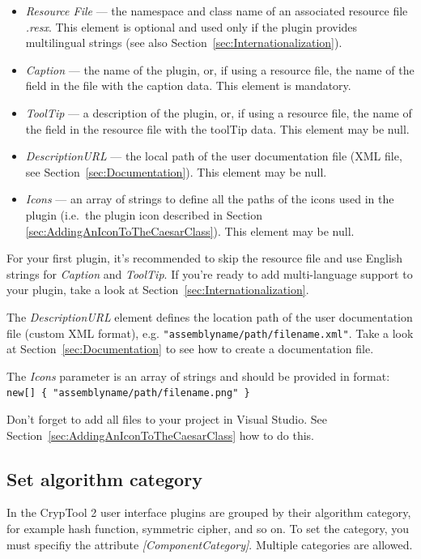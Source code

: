 \begin{itemize}
	\item \textit{Resource File} --- the namespace and class name of an associated resource file \textit{.resx}. This element is optional and used only if the plugin provides multilingual strings (see also Section~\ref{sec:Internationalization}).
	\item \textit{Caption} --- the name of the plugin, or, if using a resource file, the name of the field in the file with the caption data. This element is mandatory.
	\item \textit{ToolTip} --- a description of the plugin, or, if using a resource file, the name of the field in the resource file with the toolTip data. This element may be null.
	\item \textit{DescriptionURL} --- the local path of the user documentation file (XML file, see Section~\ref{sec:Documentation}). This element may be null.
	\item \textit{Icons} --- an array of strings to define all the paths of the icons used in the plugin (i.e.\ the plugin icon described in Section \ref{sec:AddingAnIconToTheCaesarClass}). This element may be null.
\end{itemize}

For your first plugin, it's recommended to skip the resource file and use English strings for \textit{Caption} and \textit{ToolTip}. If you're ready to add multi-language support to your plugin, take a look at Section~\ref{sec:Internationalization}.

The \textit{DescriptionURL} element defines the location path of the user documentation file (custom XML format), e.g. \texttt{"assemblyname/path/filename.xml"}. Take a look at Section~\ref{sec:Documentation} to see how to create a documentation file.

The \textit{Icons} parameter is an array of strings and should be provided in format: \\
\texttt{new[] \{ "assemblyname/path/filename.png" \} }

Don't forget to add all files to your project in Visual Studio. See Section~\ref{sec:AddingAnIconToTheCaesarClass} how to do this.

\subsection{Set algorithm category}
\label{sec:AlgorithmCategory}

In the CrypTool 2 user interface plugins are grouped by their algorithm category, for example hash function, symmetric cipher, and so on. To set the category, you must specifiy the attribute \textit{[ComponentCategory]}. Multiple categories are allowed.

